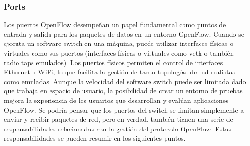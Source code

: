 \subsubsection{Ports}

Los puertos OpenFlow desempeñan un papel fundamental como puntos de entrada y salida para los paquetes de datos en un entorno OpenFlow. Cuando se ejecuta un software switch en una máquina, puede utilizar interfaces físicas o virtuales como sus puertos (interfaces físicas o virtuales como \gls{veth} o también radio taps emulados). Los puertos físicos permiten el control de interfaces Ethernet o WiFi, lo que facilita la gestión de tanto topologías de red realistas como emuladas. Aunque la velocidad del software switch puede ser limitada dado que trabaja en espacio de usuario, la posibilidad de crear un entorno de pruebas mejora la experiencia de los usuarios que desarrollan y evalúan aplicaciones OpenFlow. Se podría pensar que los puertos del switch se limitan simplemente a enviar y recibir paquetes de red, pero en verdad, también tienen una serie de responsabilidades relacionadas con la gestión del protocolo OpenFlow. Estas responsabilidades se pueden resumir en los siguientes puntos.

